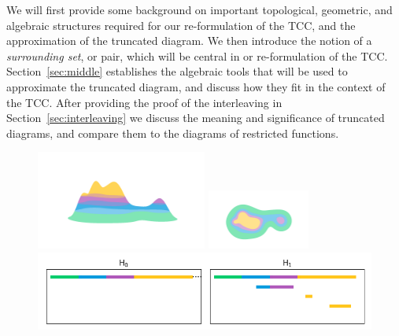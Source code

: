 We will first provide some background on important topological, geometric, and algebraic structures required for our re-formulation of the TCC, and the approximation of the truncated diagram.
We then introduce the notion of a \emph{surrounding set}, or pair, which will be central in or re-formulation of the TCC.
Section~\ref{sec:middle} establishes the algebraic tools that will be used to approximate the truncated diagram, and discuss how they fit in the context of the TCC.
After providing the proof of the interleaving in Section~\ref{sec:interleaving} we discuss the meaning and significance of truncated diagrams, and compare them to the diagrams of restricted functions.


\begin{figure}[htbp]
  \centering
  \includegraphics[trim=200 200 200 200, clip, width=0.5\textwidth]{scripts/figures/surf/side.png}
  \includegraphics[trim=200 0 200 200, clip, width=0.3\textwidth]{scripts/figures/surf/top.png}
  \includegraphics[scale=0.75]{scripts/figures/scalar_barcode_true.png}
\end{figure}

